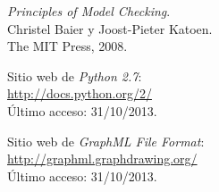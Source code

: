  \emph{Principles of Model Checking}.\\
 Christel Baier y Joost-Pieter Katoen.\\
 The MIT Press, 2008.




%
%


 Sitio web de \emph{Python 2.7}:\\
 \url{http://docs.python.org/2/}\\
 Último acceso: 31/10/2013.

 Sitio web de \emph{GraphML File Format}:\\
 \url{http://graphml.graphdrawing.org/}\\
 Último acceso: 31/10/2013.
